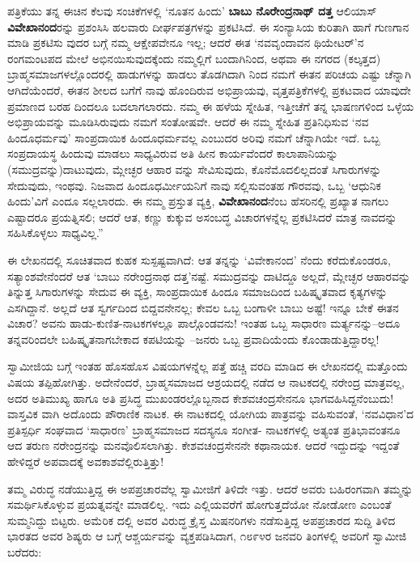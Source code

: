  ಪತ್ರಿಕೆಯು ತನ್ನ ಈಚಿನ ಕೆಲವು ಸಂಚಿಕೆಗಳಲ್ಲಿ ‘ನೂತನ ಹಿಂದು’ \textbf{ಬಾಬು ನೊರೇಂದ್ರನಾಥ್ ದತ್ತ } ಆಲಿಯಾಸ್​ \textbf{ವಿವೇಖಾನಂದ}ರನ್ನು ಪ್ರಶಂಸಿಸಿ ಹಲವಾರು ದೀರ್ಘಪತ್ರಗಳನ್ನು ಪ್ರಕಟಿಸಿದೆ. ಈ ಸಂನ್ಯಾಸಿಯ ಕುರಿತಾಗಿ ಹಾಗೆ ಗುಣಗಾನ ಮಾಡಿ ಪ್ರಕಟಿಸು ವುದರ ಬಗ್ಗೆ ನಮ್ಮ ಆಕ್ಷೇಪವೇನೂ ಇಲ್ಲ; ಆದರೆ ಈತ ‘ನವವೃಂದಾವನ ಥಿಯೇಟರ್​’ನ ರಂಗಮಂಟಪದ ಮೇಲೆ ಅಭಿನಯಿಸುವುದಕ್ಕೆಂದು ನಮ್ಮಲ್ಲಿಗೆ ಬಂದಾಗಿನಿಂದ, ಅಥವಾ ಈ ನಗರದ (ಕಲ್ಕತ್ತದ) ಬ್ರಾಹ್ಮಸಮಾಜಗಳಲ್ಲೊಂದರಲ್ಲಿ ಹಾಡುಗಳನ್ನು ಹಾಡಲು ತೊಡಗಿದಾಗಿ ನಿಂದ ನಮಗೆ ಈತನ ಪರಿಚಯ ಎಷ್ಟು ಚೆನ್ನಾಗಿ ಆಗಿದೆಯೆಂದರೆ, ಈತನ ಶೀಲದ ಬಗೆಗೆ ನಾವು ಹೊಂದಿರುವ ಅಭಿಪ್ರಾಯವು, ವೃತ್ತಪತ್ರಿಕೆಗಳಲ್ಲಿ ಪ್ರಕಟವಾದ ಯಾವುದೇ ಪ್ರಮಾಣದ ಬರಹ ದಿಂದಲೂ ಬದಲಾಗಲಾರದು. ನಮ್ಮ ಈ ಹಳೆಯ ಸ್ನೇಹಿತ, ಇತ್ತೀಚೆಗೆ ತನ್ನ ಭಾಷಣಗಳಿಂದ ಒಳ್ಳೆಯ ಅಭಿಪ್ರಾಯವನ್ನು ಮೂಡಿಸಿರುವುದು ನಮಗೆ ಸಂತೋಷವೇ. ಆದರೆ ಈ ನಮ್ಮ ಸ್ನೇಹಿತ ಪ್ರತಿನಿಧಿಸುವ ‘ನವ ಹಿಂದೂಧರ್ಮವು’ ಸಾಂಪ್ರದಾಯಿಕ ಹಿಂದೂಧರ್ಮವಲ್ಲ ಎಂಬುದರ ಅರಿವು ನಮಗೆ ಚೆನ್ನಾಗಿಯೇ ಇದೆ. ಒಬ್ಬ ಸಂಪ್ರದಾಯಸ್ಥ ಹಿಂದುವು ಮಾಡಲು ಸಾಧ್ಯವಿರುವ ಅತಿ ಹೀನ ಕಾರ್ಯವೆಂದರೆ ಕಾಲಾಪಾನಿಯನ್ನು (ಸಮುದ್ರವನ್ನು)ದಾಟುವುದು, ಮ್ಲೇಚ್ಛರ ಆಹಾರ ವನ್ನು ಸೇವಿಸುವುದು, ಕೊನೆಮೊದಲಿಲ್ಲದಂತೆ ಸಿಗಾರುಗಳನ್ನು ಸೇದುವುದು, ಇಂಥವು. ನಿಜವಾದ ಹಿಂದೂಧರ್ಮೀಯನಿಗೆ ನಾವು ಸಲ್ಲಿಸುವಂತಹ ಗೌರವವು, ಒಬ್ಬ ‘ಆಧುನಿಕ ಹಿಂದು’ವಿಗೆ ಎಂದೂ ಸಲ್ಲಲಾರದು. ಈ ನಮ್ಮ ಪ್ರಸ್ತುತ ವ್ಯಕ್ತಿ, \textbf{ವಿವೇಖಾನಂದ}ನೆಂಬ ಹೆಸರಿನಲ್ಲಿ ಪ್ರಖ್ಯಾತ ನಾಗಲು ಎಷ್ಟಾದರೂ ಪ್ರಯತ್ನಿಸಲಿ; ಆದರೆ ಆತ, ಕಣ್ಣು ಕುಕ್ಕುವ ಅಸಂಬದ್ಧ ವಿಚಾರಗಳನ್ನೆಲ್ಲ ಪ್ರಕಟಿಸಿದರೆ ಮಾತ್ರ ನಾವದನ್ನು ಸಹಿಸಿಕೊಳ್ಳಲು ಸಾಧ್ಯವಿಲ್ಲ.”

ಈ ಲೇಖನದಲ್ಲಿ ಸೂಚಿತವಾದ ಕುಹಕ ಸುಸ್ಪಷ್ಟವಾಗಿದೆ: ಆತ ತನ್ನನ್ನು ‘ವಿವೇಕಾನಂದ’ ನೆಂದು ಕರೆದುಕೊಂಡರೂ, ಸತ್ಯಾಂಶವೇನೆಂದರೆ ಆತ ‘ಬಾಬು ನರೇಂದ್ರನಾಥ ದತ್ತ’ನಷ್ಟೆ. ಸಮುದ್ರವನ್ನು ದಾಟಿದ್ದೂ ಅಲ್ಲದೆ, ಮ್ಲೇಚ್ಛರ ಆಹಾರವನ್ನು ತಿನ್ನುತ್ತ ಸಿಗಾರುಗಳನ್ನು ಸೇದುವ ಈ ವ್ಯಕ್ತಿ, ಸಾಂಪ್ರದಾಯಿಕ ಹಿಂದೂ ಸಮಾಜದಿಂದ ಬಹಿಷ್ಕೃತವಾದ ಕೃತ್ಯಗಳನ್ನು ಎಸಗಿದ್ದಾನೆ. ಅಲ್ಲದೆ ಆತ ಸ್ವರ್ಗದಿಂದ ಬಿದ್ದವನೇನಲ್ಲ; ಕೇವಲ ಒಬ್ಬ ಬಂಗಾಳೀ ಬಾಬು ಅಷ್ಟೆ! ಇನ್ನೂ ಬೇಕೆ ಈತನ ವಿಚಾರ? ಅವನು ಹಾಡು-ಕುಣಿತ-ನಾಟಕಗಳಲ್ಲೂ ಪಾಲ್ಗೊಂಡವನು! ಇಂತಹ ಒಬ್ಬ ಸಾಧಾರಣ ಮರ್ತ್ಯನನ್ನು–ಅದೂ ತನ್ನವರಿಂದಲೇ ಬಹಿಷ್ಕೃತನಾಗಬೇಕಾದ ಕಪಟಿಯನ್ನು –ಜನರು ಒಬ್ಬ ಪ್ರವಾದಿಯೆಂದು ಕೊಂಡಾಡುತ್ತಿದ್ದಾರಲ್ಲ!

ಸ್ವಾಮೀಜಿಯ ಬಗ್ಗೆ ಇಂತಹ ಹೊಸಹೊಸ ವಿಷಯಗಳನ್ನೆಲ್ಲ ಪತ್ತೆ ಹಚ್ಚಿ ವರದಿ ಮಾಡಿದ ಈ ಲೇಖನದಲ್ಲಿ ಮತ್ತೊಂದು ವಿಷಯ ತಪ್ಪಿಹೋಗಿತ್ತು. ಅದೇನೆಂದರೆ, ಬ್ರಾಹ್ಮಸಮಾಜದ ಆಶ್ರಯದಲ್ಲಿ ನಡೆದ ಆ ನಾಟಕದಲ್ಲಿ ನರೇಂದ್ರ ಮಾತ್ರವಲ್ಲ, ಅದರ ಅತಿಮುಖ್ಯ ಹಾಗೂ ಅತಿ ಪ್ರಸಿದ್ಧ ಮುಖಂಡರಲ್ಲೊಬ್ಬನಾದ ಕೇಶವಚಂದ್ರಸೇನನೂ ಭಾಗವಹಿಸಿದ್ದನೆಂಬುದು! ವಾಸ್ತವಿಕ ವಾಗಿ ಅದೊಂದು ಪೌರಾಣಿಕ ನಾಟಕ. ಈ ನಾಟಕದಲ್ಲಿ ಯೋಗಿಯ ಪಾತ್ರವನ್ನು ವಹಿಸುವಂತೆ, ‘ನವವಿಧಾನ’ದ ಪ್ರತಿಸ್ಪರ್ಧಿ ಸಂಘವಾದ ‘ಸಾಧಾರಣ’ ಬ್ರಾಹ್ಮಸಮಾಜದ ಸದಸ್ಯನೂ ಸಂಗೀತ- ನಾಟಕಗಳಲ್ಲಿ ಅತ್ಯಂತ ಪ್ರತಿಭಾವಂತನೂ ಆದ ತರುಣ ನರೇಂದ್ರನನ್ನು ಮನವೊಲಿಸಲಾಗಿತ್ತು. ಕೇಶವಚಂದ್ರಸೇನನೇ ಕಥಾನಾಯಕ. ಆದರೆ ಇದ್ದುದನ್ನು ಇದ್ದಂತೆ ಹೇಳಿದ್ದರೆ ಅಪವಾದಕ್ಕೆ ಅವಕಾಶವೆಲ್ಲಿರುತ್ತಿತ್ತು!

ತಮ್ಮ ವಿರುದ್ಧ ನಡೆಯುತ್ತಿದ್ದ ಈ ಅಪಪ್ರಚಾರವೆಲ್ಲ ಸ್ವಾಮೀಜಿಗೆ ತಿಳಿದೇ ಇತ್ತು. ಆದರೆ ಅವರು ಬಹಿರಂಗವಾಗಿ ತಮ್ಮನ್ನು ಸಮರ್ಥಿಸಿಕೊಳ್ಳುವ ಪ್ರಯತ್ನವನ್ನೇ ಮಾಡಲಿಲ್ಲ. ಇದು ಎಲ್ಲಿಯವರೆಗೆ ಹೋಗುತ್ತದೆಯೋ ನೋಡೋಣ ಎಂಬಂತೆ ಸುಮ್ಮನಿದ್ದು ಬಿಟ್ಟರು. ಅಮೆರಿಕ ದಲ್ಲಿ ಅವರ ವಿರುದ್ಧ ಕ್ರೈಸ್ತ ಮಿಷನರಿಗಳು ನಡೆಸುತ್ತಿದ್ದ ಅಪಪ್ರಚಾರದ ಸುದ್ದಿ ತಿಳಿದ ಭಾರತದ ಅವರ ಶಿಷ್ಯರು ಆ ಬಗ್ಗೆ ಆಶ್ಚರ್ಯವನ್ನು ವ್ಯಕ್ತಪಡಿಸಿದಾಗ, ೧೮೯೪ರ ಜನವರಿ ತಿಂಗಳಲ್ಲಿ ಅವರಿಗೆ ಸ್ವಾಮೀಜಿ ಬರೆದರು:

